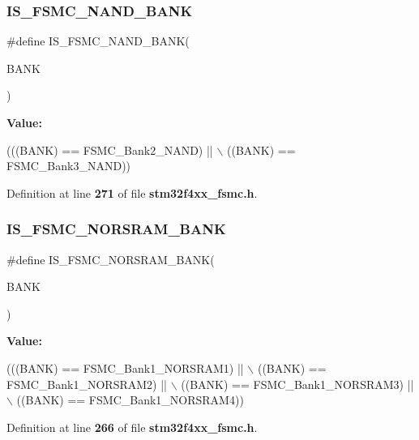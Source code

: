 \subsubsection{I\+S\+\_\+\+F\+S\+M\+C\+\_\+\+N\+A\+N\+D\+\_\+\+B\+A\+NK}
{\footnotesize\ttfamily \#define I\+S\+\_\+\+F\+S\+M\+C\+\_\+\+N\+A\+N\+D\+\_\+\+B\+A\+NK(\begin{DoxyParamCaption}\item[{}]{B\+A\+NK }\end{DoxyParamCaption})}

{\bfseries Value\+:}
\begin{DoxyCode}
(((BANK) == FSMC_Bank2_NAND) || \(\backslash\)
                                 ((BANK) == FSMC_Bank3_NAND))
\end{DoxyCode}


Definition at line \textbf{ 271} of file \textbf{ stm32f4xx\+\_\+fsmc.\+h}.

\mbox{\label{group__FSMC__Exported__Constants_ga3e3bed3dd83d38e63f11ac4cbcb87304}} 
\subsubsection{I\+S\+\_\+\+F\+S\+M\+C\+\_\+\+N\+O\+R\+S\+R\+A\+M\+\_\+\+B\+A\+NK}
{\footnotesize\ttfamily \#define I\+S\+\_\+\+F\+S\+M\+C\+\_\+\+N\+O\+R\+S\+R\+A\+M\+\_\+\+B\+A\+NK(\begin{DoxyParamCaption}\item[{}]{B\+A\+NK }\end{DoxyParamCaption})}

{\bfseries Value\+:}
\begin{DoxyCode}
(((BANK) == FSMC_Bank1_NORSRAM1) || \(\backslash\)
                                    ((BANK) == FSMC_Bank1_NORSRAM2) || \(\backslash\)
                                    ((BANK) == FSMC_Bank1_NORSRAM3) || \(\backslash\)
                                    ((BANK) == FSMC_Bank1_NORSRAM4))
\end{DoxyCode}


Definition at line \textbf{ 266} of file \textbf{ stm32f4xx\+\_\+fsmc.\+h}.

